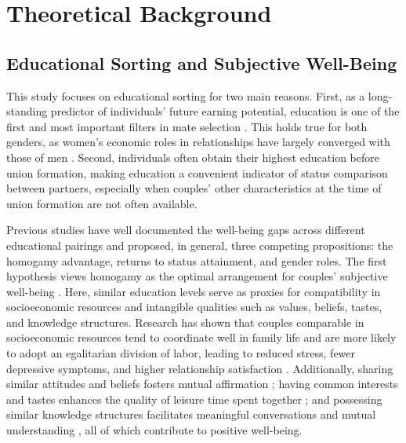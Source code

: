 \section{Theoretical Background}
\label{sec:ch3-theoretical-background}

\subsection{Educational Sorting and Subjective Well-Being}

This study focuses on educational sorting for two main reasons. First, as a long-standing predictor of individuals' future earning potential, education is one of the first and most important filters in mate selection \parencite{kalmijnIntermarriageHomogamyCauses1998,schwartzTrendsEducationalAssortative2005}. This holds true for both genders, as women's economic roles in relationships have largely converged with those of men \parencite{oppenheimerTheoryMarriageTiming1988}. Second, individuals often obtain their highest education before union formation, making education a convenient indicator of status comparison between partners, especially when couples' other characteristics at the time of union formation are not often available.

Previous studies have well documented the well-being gaps across different educational pairings and proposed, in general, three competing propositions: the homogamy advantage, returns to status attainment, and gender roles. The first hypothesis views homogamy as the optimal arrangement for couples’ subjective well-being \parencite{kalmijnIntermarriageHomogamyCauses1998}. Here, similar education levels serve as proxies for compatibility in socioeconomic resources and intangible qualities such as values, beliefs, tastes, and knowledge structures. Research has shown that couples comparable in socioeconomic resources tend to coordinate well in family life and are more likely to adopt an egalitarian division of labor, leading to reduced stress, fewer depressive symptoms, and higher relationship satisfaction \parencite{nitscheCouplesIdeologicalPairings2023}. Additionally, sharing similar attitudes and beliefs fosters mutual affirmation \parencite{berlamontCoupleSimilarityEmpathic2024}; having common interests and tastes enhances the quality of leisure time spent together \parencite{beckerSelectionAlignmentTheir2010}; and possessing similar knowledge structures facilitates meaningful conversations and mutual understanding \parencite{gauntCoupleSimilarityMarital2006}, all of which contribute to positive well-being.

